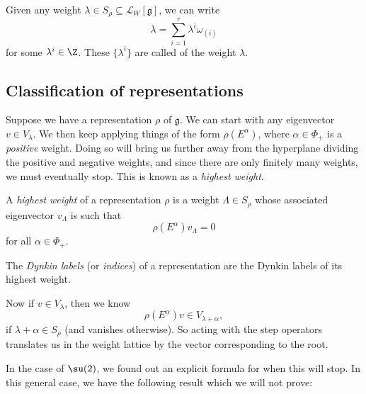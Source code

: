\documentclass[a4paper]{article}
\begin{document}
Given any weight $\lambda \in S_\rho \subseteq \mathcal{L}_W[\mathfrak{g}]$, we can write
\[
  \lambda = \sum_{i = 1}^r \lambda^i \omega_{(i)}
\]
for some $\lambda^i \in \Z$. These $\{\lambda^i\}$ are called  of the weight $\lambda$.

%
\subsection{Classification of representations}
Suppose we have a representation $\rho$ of $\mathfrak{g}$. We can start with any eigenvector $v \in V_\lambda$. We then keep applying things of the form $\rho(E^\alpha)$, where $\alpha \in \Phi_+$ is a \emph{positive} weight. Doing so will bring us further away from the hyperplane dividing the positive and negative weights, and since there are only finitely many weights, we must eventually stop. This is known as a \emph{highest weight}.

\begin{defi}
  A \emph{highest weight} of a representation $\rho$ is a weight $\Lambda \in S_\rho$ whose associated eigenvector $v_\Lambda$ is such that
  \[
    \rho(E^\alpha) v_\Lambda = 0
  \]
  for all $\alpha \in \Phi_+$.
\end{defi}
The \emph{Dynkin labels} (or \emph{indices}) of a representation are the Dynkin labels of its highest weight.

Now if $v \in V_\lambda$, then we know
\[
  \rho(E^\alpha) v \in V_{\lambda + \alpha},
\]
if $\lambda + \alpha \in S_\rho$ (and vanishes otherwise). So acting with the step operators translates us in the weight lattice by the vector corresponding to the root.

In the case of $\su(2)$, we found out an explicit formula for when this will stop. In this general case, we have the following result which we will not prove:
\end{document}
